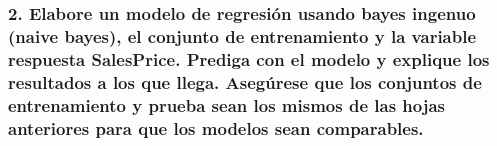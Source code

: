\documentclass[
]{article}
\begin{document}
\hypertarget{elabore-un-modelo-de-regresiuxf3n-usando-bayes-ingenuo-naive-bayes-el-conjunto-de-entrenamiento-y-la-variable-respuesta-salesprice.-prediga-con-el-modelo-y-explique-los-resultados-a-los-que-llega.-aseguxfarese-que-los-conjuntos-de-entrenamiento-y-prueba-sean-los-mismos-de-las-hojas-anteriores-para-que-los-modelos-sean-comparables.}{%
\subsubsection{2. Elabore un modelo de regresión usando bayes ingenuo
(naive bayes), el conjunto de entrenamiento y la variable respuesta
SalesPrice. Prediga con el modelo y explique los resultados a los que
llega. Asegúrese que los conjuntos de entrenamiento y prueba sean los
mismos de las hojas anteriores para que los modelos sean
comparables.}\label{elabore-un-modelo-de-regresiuxf3n-usando-bayes-ingenuo-naive-bayes-el-conjunto-de-entrenamiento-y-la-variable-respuesta-salesprice.-prediga-con-el-modelo-y-explique-los-resultados-a-los-que-llega.-aseguxfarese-que-los-conjuntos-de-entrenamiento-y-prueba-sean-los-mismos-de-las-hojas-anteriores-para-que-los-modelos-sean-comparables.}}
\end{document}
